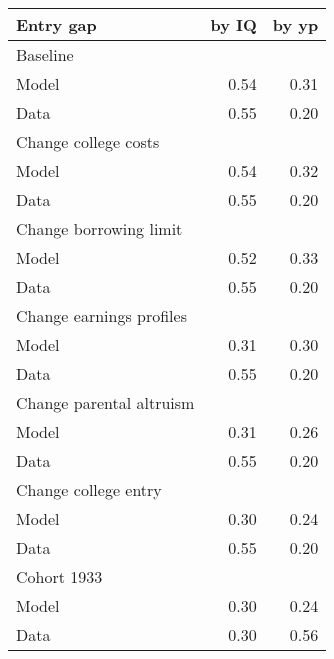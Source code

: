 \begin{tabular}{lrr}
\hline
Entry gap & by IQ  & by yp  \\ 
\hline
Baseline &   &   \\ 
Model & 0.54  & 0.31  \\ 
Data & 0.55  & 0.20  \\ 
Change college costs &   &   \\ 
Model & 0.54  & 0.32  \\ 
Data & 0.55  & 0.20  \\ 
Change borrowing limit &   &   \\ 
Model & 0.52  & 0.33  \\ 
Data & 0.55  & 0.20  \\ 
Change earnings profiles &   &   \\ 
Model & 0.31  & 0.30  \\ 
Data & 0.55  & 0.20  \\ 
Change parental altruism &   &   \\ 
Model & 0.31  & 0.26  \\ 
Data & 0.55  & 0.20  \\ 
Change college entry &   &   \\ 
Model & 0.30  & 0.24  \\ 
Data & 0.55  & 0.20  \\ 
Cohort 1933 &   &   \\ 
Model & 0.30  & 0.24  \\ 
Data & 0.30  & 0.56  \\ 
\hline
\end{tabular}%
